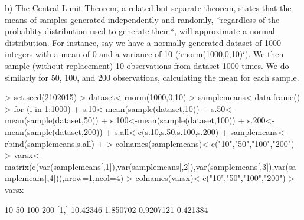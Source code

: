 \documentclass[12pt,letterpaper]{article}
\begin{document}
{b) The Central Limit Theorem, a related but separate theorem, states that the means of samples generated independently and randomly, *regardless of the probablity distribution used to generate them*, will approximate a normal distribution.
For instance, say we have a normally-generated dataset of 1000 integers with a mean of 0 and a variance of 10 (`rnorm(1000,0,10)`).  We then sample (without replacement) 10 observations from dataset 1000 times.  We do similarly for 50, 100, and 200 observations, calculating the mean for each sample.
\begin{Schunk}
\begin{Sinput}
> set.seed(2102015)
> dataset<-rnorm(1000,0,10)
> samplemeans<-data.frame()
> for (i in 1:1000){
+     s.10<-mean(sample(dataset,10))
+     s.50<-mean(sample(dataset,50))
+     s.100<-mean(sample(dataset,100))
+     s.200<-mean(sample(dataset,200))
+     s.all<-c(s.10,s.50,s.100,s.200)
+     samplemeans<-rbind(samplemeans,s.all)
+ }
> colnames(samplemeans)<-c("10","50","100","200")
> varsx<-matrix(c(var(samplemeans[,1]),var(samplemeans[,2]),var(samplemeans[,3]),var(samplemeans[,4])),nrow=1,ncol=4)
> colnames(varsx)<-c("10","50","100","200")
> varsx
\end{Sinput}
\begin{Soutput}
           10       50       100      200
[1,] 10.42346 1.850702 0.9207121 0.421384
\end{Soutput}
\end{Schunk}


}
\end{document}
